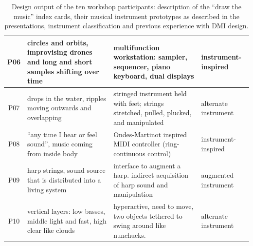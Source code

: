\documentclass[letterpaper, 12pt]{article}
\begin{document}
\begin{table}[htbp]
\begin{centering}
\begin{tabular}{ c L{5.1cm} L{5.8cm} C{2.5cm} }
            P06 &
            circles and orbits, improvising drones and long and short samples shifting over time &
            multifunction workstation: sampler, sequencer, piano keyboard, dual displays &
            instrument-inspired \\ \hline
            
            P07 &
            drops in the water, ripples moving outwards and overlapping &
            stringed instrument held with feet; strings stretched, pulled, plucked, and manipulated &
            alternate instrument \\ \hline
            
            P08 &
            ``any time I hear or feel sound'', music coming from inside body &
            Ondes-Martinot inspired MIDI controller (ring-continuous control) &
            instrument-inspired \\ \hline
            
            P09 &
            harp strings, sound source that is distributed into a living system &
            interface to augment a harp. indirect acquisition of harp sound and manipulation &
            augmented instrument \\ \hline
            
            P10 &
            vertical layers: low basses, middle light and fast, high clear like clouds &
            hyperactive, need to move, two objects tethered to swing around like nunchucks. &
            alternate instrument \\ 
\hline
            
        \end{tabular}
        \caption[Design for Performance workshop: Design outputs]{Design output of the ten workshop participants: description of the ``draw the music'' index cards, their musical instrument prototypes as described in the presentations, instrument classification and previous experience with DMI design.}
        \label{ch3-tab:participant-outputs}
    \end{centering}
\end{table}

\end{document}
